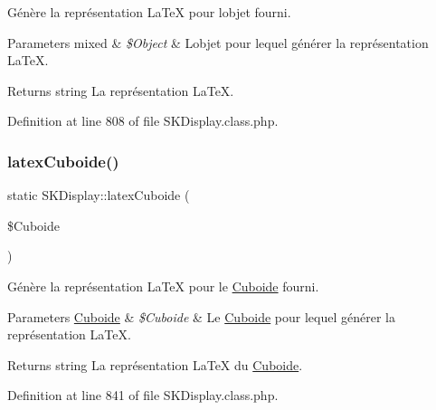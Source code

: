 Génère la représentation La\+TeX pour l\textquotesingle{}objet fourni.


\begin{DoxyParams}[1]{Parameters}
mixed & {\em \$\+Object} & L\textquotesingle{}objet pour lequel générer la représentation La\+TeX. \\
\hline
\end{DoxyParams}
\begin{DoxyReturn}{Returns}
string La représentation La\+TeX. 
\end{DoxyReturn}


Definition at line 808 of file S\+K\+Display.\+class.\+php.

\mbox{\label{class_s_k_display_a97e010c8dd0ece888953d591da09457f}} 
\subsubsection{\texorpdfstring{latex\+Cuboide()}{latexCuboide()}}
{\footnotesize\ttfamily static S\+K\+Display\+::latex\+Cuboide (\begin{DoxyParamCaption}\item[{}]{\$\+Cuboide }\end{DoxyParamCaption})\hspace{0.3cm}{\ttfamily [static]}}

Génère la représentation La\+TeX pour le \hyperlink{class_cuboide}{Cuboide} fourni.


\begin{DoxyParams}[1]{Parameters}
\hyperlink{class_cuboide}{Cuboide} & {\em \$\+Cuboide} & Le \hyperlink{class_cuboide}{Cuboide} pour lequel générer la représentation La\+TeX. \\
\hline
\end{DoxyParams}
\begin{DoxyReturn}{Returns}
string La représentation La\+TeX du \hyperlink{class_cuboide}{Cuboide}. 
\end{DoxyReturn}


Definition at line 841 of file S\+K\+Display.\+class.\+php.

\mbox{\label{class_s_k_display_abd02d55d8d7314afbfbf241ef6f72126}} 
